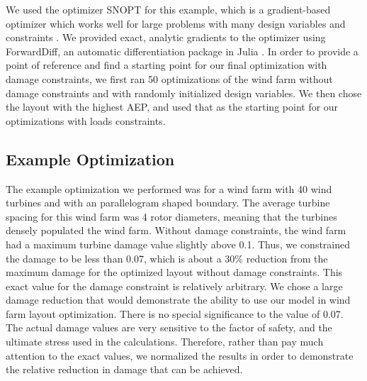 \documentclass[11pt,letterpaper]{article}
\begin{document}
We used the optimizer SNOPT for this example, which is a gradient-based optimizer which works well for large problems with many design variables and constraints \cite{gill2005snopt}. We provided exact, analytic gradients to the optimizer using ForwardDiff, an automatic differentiation package in Julia \cite{revels2016forward}.
In order to provide a point of reference and find a starting point for our final optimization with damage constraints, we first ran 50 optimizations of the wind farm without damage constraints and with randomly initialized design variables. We then chose the layout with the highest AEP, and used that as the starting point for our optimizations with loads constraints.


\subsection{Example Optimization}

The example optimization we performed was for a wind farm with 40 wind turbines and with an parallelogram shaped boundary. The average turbine spacing for this wind farm was 4 rotor diameters, meaning that the turbines densely populated the wind farm. Without damage constraints, the wind farm had a maximum turbine damage value slightly above 0.1. Thus, we constrained the damage to be less than 0.07, which is about a 30\% reduction from the maximum damage for the optimized layout without damage constraints. This exact value for the damage constraint is relatively arbitrary. We chose a large damage reduction that would demonstrate the ability to use our model in wind farm layout optimization. There is no special significance to the value of 0.07. The actual damage values are very sensitive to the factor of safety, and the ultimate stress used in the calculations. Therefore, rather than pay much attention to the exact values, we normalized the results in order to demonstrate the relative reduction in damage that can be achieved.
\end{document}
